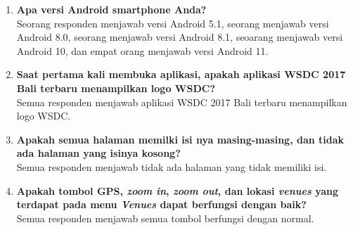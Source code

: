 \begin{enumerate}
	\item \textbf{Apa versi Android smartphone Anda?} \\
	Seorang responden menjawab versi Android 5.1, seorang menjawab versi Android 8.0, seorang menjawab versi Android 8.1, seoarang menjawab versi Android 10, dan empat orang menjawab versi Android 11.
	\item \textbf{Saat pertama kali membuka aplikasi, apakah aplikasi WSDC 2017 Bali terbaru menampilkan logo WSDC?} \\
	Semua responden menjawab aplikasi WSDC 2017 Bali terbaru menampilkan logo WSDC.

	\item \textbf{Apakah semua halaman memilki isi nya masing-masing, dan tidak ada halaman yang isinya kosong?} \\
	Semua responden menjawab tidak ada halaman yang tidak memiliki isi.

	\item \textbf{Apakah tombol GPS, \textit{zoom in}, \textit{zoom out}, dan lokasi \textit{venues} yang terdapat pada menu \textit{Venues} dapat berfungsi dengan baik?} \\
	Semua responden menjawab semua tombol berfungsi dengan normal.
	

\end{enumerate}
